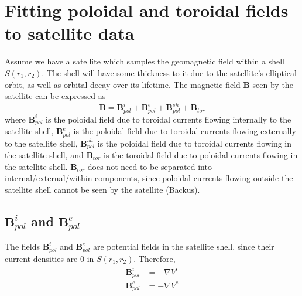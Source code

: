 \documentclass{article}
\newcommand{\B}{\mathbf{B}}
\begin{document}
\section{Fitting poloidal and toroidal fields to satellite data}

Assume we have a satellite which samples the geomagnetic field
within a shell $S(r_1,r_2)$. The shell will have some thickness to it
due to the satellite's elliptical orbit, as well as orbital decay
over its lifetime. The magnetic field $\B$ seen by the satellite can
be expressed as
\begin{equation}
\B = \B_{pol}^i + \B_{pol}^e + \B_{pol}^{sh} + \B_{tor}
\end{equation}
where $\B_{pol}^i$ is the poloidal field due to toroidal currents flowing
internally to the satellite shell, $\B_{pol}^e$ is the poloidal field
due to toroidal currents flowing externally to the satellite shell,
$\B_{pol}^{sh}$ is the poloidal field due to toroidal currents flowing
in the satellite shell, and $\B_{tor}$ is the toroidal field due
to poloidal currents flowing in the satellite shell. $\B_{tor}$ does
not need to be separated into internal/external/within components,
since poloidal currents flowing outside the satellite shell cannot
be seen by the satellite (Backus).

\subsection{$\B_{pol}^i$ and $\B_{pol}^e$}

The fields $\B_{pol}^i$ and $\B_{pol}^e$ are potential fields in the
satellite shell, since their current densities are 0 in $S(r_1,r_2)$.
Therefore,
\begin{align}
\B_{pol}^i &= -\nabla V^i \\
\B_{pol}^e &= -\nabla V^e
\end{align}
\end{document}
